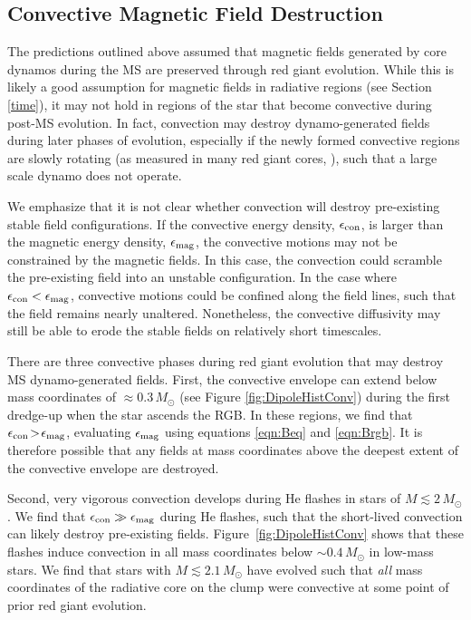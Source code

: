 \subsection{Convective Magnetic Field Destruction}

The predictions outlined above assumed that magnetic fields generated by core dynamos during the MS are preserved through red giant evolution. While this is likely a good assumption for magnetic fields in radiative regions (see Section \ref{time}), it may not hold in regions of the star that become convective during post-MS evolution. In fact, convection may destroy dynamo-generated fields during later phases of evolution, especially if the newly formed convective regions are slowly rotating (as measured in many red giant cores, \cite{Mosser_2012}), such that a large scale dynamo does not operate.

We emphasize that it is not clear whether convection will destroy pre-existing stable field configurations. If the convective energy density, $\epsilon_{\rm con}$, is larger than the magnetic energy density, $\epsilon_{\rm mag}$, the convective motions may not be constrained by the magnetic fields. In this case, the convection could scramble the pre-existing field into an unstable configuration. In the case where $\epsilon_{\rm con} < \epsilon_{\rm mag}$, convective motions could be confined along the field lines, such that the field remains nearly unaltered. Nonetheless, the convective diffusivity may still be able to erode the stable fields on relatively short timescales.

There are three convective phases during red giant evolution that may destroy MS dynamo-generated fields. First, the convective envelope can extend below mass coordinates of $\approx 0.3 \, M_\odot$ (see Figure \ref{fig:DipoleHistConv}) during the first dredge-up when the star ascends the RGB. In these regions, we find that $\epsilon_{\rm con} \! > \! \epsilon_{\rm mag}$, evaluating $\epsilon_{\rm mag}$ using equations \ref{eqn:Beq} and \ref{eqn:Brgb}. It is therefore possible that any fields at mass coordinates above the deepest extent of the convective envelope are destroyed.

Second, very vigorous convection develops during He flashes in stars of $M \lesssim 2 \, M_\odot$ \citep{Bildsten_2011}. We find that $\epsilon_{\rm con} \gg \epsilon_{\rm mag}$ during He flashes, such that the short-lived convection can likely destroy pre-existing fields. Figure~\ref{fig:DipoleHistConv} shows that these flashes induce convection in all mass coordinates below $ \sim \! 0.4 \, M_\odot$ in low-mass stars. We find that stars with $M \lesssim 2.1 \, M_\odot$ have evolved such that {\it all} mass coordinates  of the radiative core on the clump were convective at some point of prior red giant evolution. 

